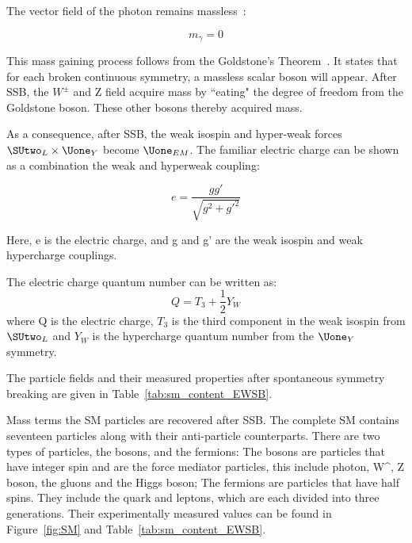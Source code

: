 The vector field of the photon remains massless~\cite{peskin2018introduction}: 

\begin{equation}
    m_{\gamma}=0
\end{equation}


This mass gaining process follows from the Goldstone's Theorem~\cite{PhysRev.117.648}. It states that for each broken continuous symmetry, a massless scalar boson will appear. After SSB, the $W^{\pm}$ and Z field acquire mass by ``eating" the degree of freedom from the Goldstone boson. These other bosons thereby acquired mass. 

As a consequence, after SSB, the weak isospin and hyper-weak forces $\SUtwo_{L} \times \Uone_{Y}$ become $\Uone_{EM}$. The familiar electric charge can be shown as a combination the weak and hyperweak coupling:

\begin{equation}
    e= \frac{g g'}{\sqrt{g^{2}+g'^{2}}}
\end{equation}

Here, e is the electric charge, and g and g' are the weak isospin and weak hypercharge couplings. 

The electric charge quantum number can be written as:
\begin{equation}
    Q=T_{3}+\frac{1}{2}Y_{W}
\end{equation}
where Q is the electric charge, $T_{3}$ is the third component in the weak isospin from $\SUtwo_{L}$ and $Y_{W}$ is the hypercharge quantum number from the $\Uone_{Y}$ symmetry. 

    

The particle fields and their measured properties after spontaneous symmetry breaking are given in Table~\ref{tab:sm_content_EWSB}.

Mass terms the SM particles are recovered after SSB. The complete SM contains seventeen particles along with their anti-particle counterparts. There are two types of particles, the bosons, and the fermions: The bosons are particles that have integer spin and are the force mediator particles, this include photon, W^{\pm}, Z boson, the gluons and the Higgs boson; The fermions are particles that have half spins.
They include the quark and leptons, which are each divided into three generations. Their experimentally measured values can be found in Figure~\ref{fig:SM} and Table~\ref{tab:sm_content_EWSB}.


